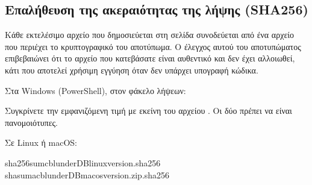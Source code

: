 \documentclass[letterpaper,10pt,greek]{sphinxmanual}
\begin{document}
\begin{figure}[htbp]
\centering

\noindent{}
\end{figure}

\begin{figure}[htbp]
\centering

\noindent{}
\end{figure}

\begin{figure}[htbp]
\centering

\noindent{}
\end{figure}


\subsection{Επαλήθευση της ακεραιότητας της λήψης (SHA256)}
\label{\detokenize{annexe_windows_securite:verifier-l-integrite-du-telechargement-sha256}}
\sphinxAtStartPar
Κάθε εκτελέσιμο αρχείο που δημοσιεύεται στη σελίδα  συνοδεύεται από ένα αρχείο  που περιέχει το κρυπτογραφικό του αποτύπωμα. Ο έλεγχος αυτού του αποτυπώματος επιβεβαιώνει ότι το αρχείο που κατεβάσατε είναι αυθεντικό και δεν έχει αλλοιωθεί, κάτι που αποτελεί χρήσιμη εγγύηση όταν δεν υπάρχει υπογραφή κώδικα.

\sphinxAtStartPar
Στα Windows (PowerShell), στον φάκελο λήψεων:

\begin{sphinxVerbatim}[commandchars=\\\{\}]
   
\end{sphinxVerbatim}

\sphinxAtStartPar
Συγκρίνετε την εμφανιζόμενη τιμή με εκείνη του αρχείου . Οι δύο πρέπει να είναι πανομοιότυπες.

\sphinxAtStartPar
Σε Linux ή macOS:

\begin{sphinxVerbatim}[commandchars=\\\{\}]
sha256sum\PYGZhy{}cblunderDB\PYGZhy{}linux\PYGZhy{}\PYGZlt{}version\PYGZgt{}.sha256
shasum\PYGZhy{}a\PYGZhy{}cblunderDB\PYGZhy{}macos\PYGZhy{}\PYGZlt{}version\PYGZgt{}.zip.sha256
\end{sphinxVerbatim}
\end{document}

